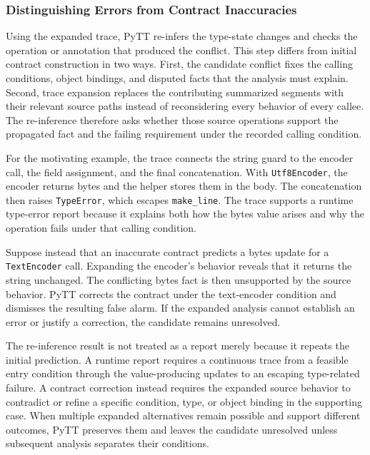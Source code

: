 \subsubsection{Distinguishing Errors from Contract Inaccuracies}

Using the expanded trace, PyTT re-infers the type-state changes and
checks the operation or annotation that produced the conflict. This step
differs from initial contract construction in two ways. First, the
candidate conflict fixes the calling conditions, object bindings, and
disputed facts that the analysis must explain. Second, trace expansion
replaces the contributing summarized segments with their relevant source
paths instead of reconsidering every behavior of every callee. The
re-inference therefore asks whether those source operations support the
propagated fact and the failing requirement under the recorded calling
condition.

For the motivating example, the trace connects the string guard to the encoder
call, the field assignment, and the final concatenation. With
\texttt{Utf8Encoder}, the encoder returns bytes and the helper stores
them in the body. The concatenation then raises \texttt{TypeError}, which
escapes \texttt{make\_line}. The trace supports a runtime type-error
report because it explains both how the bytes value arises and why the
operation fails under that calling condition.

Suppose instead that an inaccurate contract predicts a bytes update for
a \texttt{TextEncoder} call. Expanding the encoder's behavior reveals
that it returns the string unchanged. The conflicting bytes fact is
then unsupported by the source behavior. PyTT corrects the contract
under the text-encoder condition and dismisses the resulting false
alarm. If the expanded analysis cannot establish an error or justify a
correction, the candidate remains unresolved.

The re-inference result is not treated as a report merely because it
repeats the initial prediction. A runtime report requires a continuous
trace from a feasible entry condition through the value-producing updates
to an escaping type-related failure. A contract correction instead
requires the expanded source behavior to contradict or refine a specific
condition, type, or object binding in the supporting case. When multiple
expanded alternatives remain possible and support different outcomes,
PyTT preserves them and leaves the candidate unresolved unless subsequent
analysis separates their conditions.

